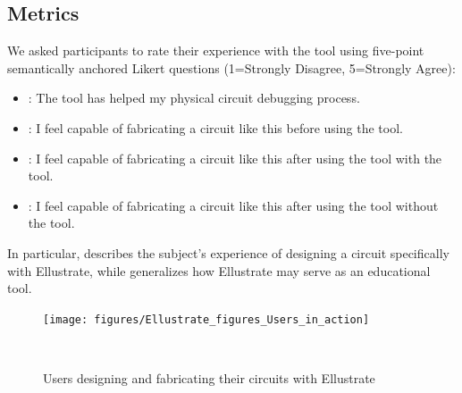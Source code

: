 \documentclass{sigchi}
\begin{document}
\subsection{Metrics}
     We asked participants to rate their experience with the tool using five-point semantically anchored Likert questions (1=Strongly Disagree, 5=Strongly Agree):
    \begin{itemize}
      \item {}: The tool has helped my physical circuit debugging process.
      \item {}: I feel capable of fabricating a circuit like this before using the tool.
      \item {}: I feel capable of fabricating a circuit like this after using the tool with the tool.
      \item {}: I feel capable of fabricating a circuit like this after using the tool without the tool.
    \end{itemize}
    In particular,   describes the subject's experience of designing a circuit specifically with Ellustrate, while
     generalizes how Ellustrate may serve as an educational tool.





\begin{figure}
\centering
  \texttt{[image: figures/Ellustrate\_figures\_Users\_in\_action]}
  \caption{Users designing and fabricating their circuits with Ellustrate}~\label{fig:users-in-action}
\end{figure}
\end{document}
